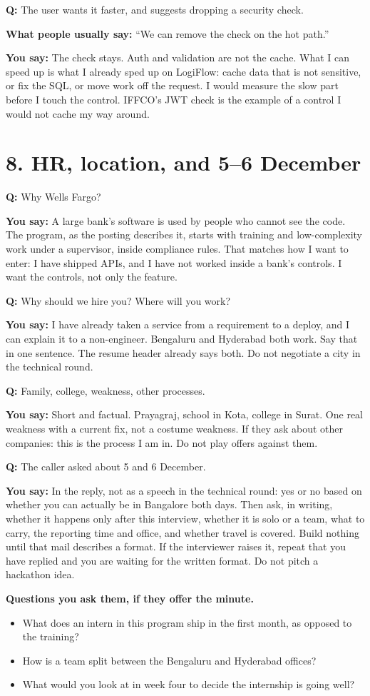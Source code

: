 \documentclass[a4paper,9.5pt]{extarticle}
\newcommand{\Q}[1]{\par\vspace{1.5pt}\noindent\textcolor{hot}{\textbf{Q:} #1}\par}
\newcommand{\Typ}[1]{\noindent\textcolor{muted}{\textbf{What people usually say:} #1}\par}
\newcommand{\Say}[1]{\noindent\textcolor{ok}{\textbf{You say:} #1}\par}
\begin{document}
\Q{The user wants it faster, and suggests dropping a security check.}
\Typ{``We can remove the check on the hot path.''}
\Say{The check stays. Auth and validation are not the cache. What I can speed up is what I already sped up on LogiFlow: cache data that is not sensitive, or fix the SQL, or move work off the request. I would measure the slow part before I touch the control. IFFCO's JWT check is the example of a control I would not cache my way around.}

\section{8. HR, location, and 5--6 December}
\Q{Why Wells Fargo?}
\Say{A large bank's software is used by people who cannot see the code. The program, as the posting describes it, starts with training and low-complexity work under a supervisor, inside compliance rules. That matches how I want to enter: I have shipped APIs, and I have not worked inside a bank's controls. I want the controls, not only the feature.}

\Q{Why should we hire you? Where will you work?}
\Say{I have already taken a service from a requirement to a deploy, and I can explain it to a non-engineer. Bengaluru and Hyderabad both work. Say that in one sentence. The resume header already says both. Do not negotiate a city in the technical round.}

\Q{Family, college, weakness, other processes.}
\Say{Short and factual. Prayagraj, school in Kota, college in Surat. One real weakness with a current fix, not a costume weakness. If they ask about other companies: this is the process I am in. Do not play offers against them.}

\Q{The caller asked about 5 and 6 December.}
\Say{In the reply, not as a speech in the technical round: yes or no based on whether you can actually be in Bangalore both days. Then ask, in writing, whether it happens only after this interview, whether it is solo or a team, what to carry, the reporting time and office, and whether travel is covered. Build nothing until that mail describes a format. If the interviewer raises it, repeat that you have replied and you are waiting for the written format. Do not pitch a hackathon idea.}

\textbf{Questions you ask them, if they offer the minute.}
\begin{itemize}
  \item What does an intern in this program ship in the first month, as opposed to the training?
  \item How is a team split between the Bengaluru and Hyderabad offices?
  \item What would you look at in week four to decide the internship is going well?
\end{itemize}
\end{document}
